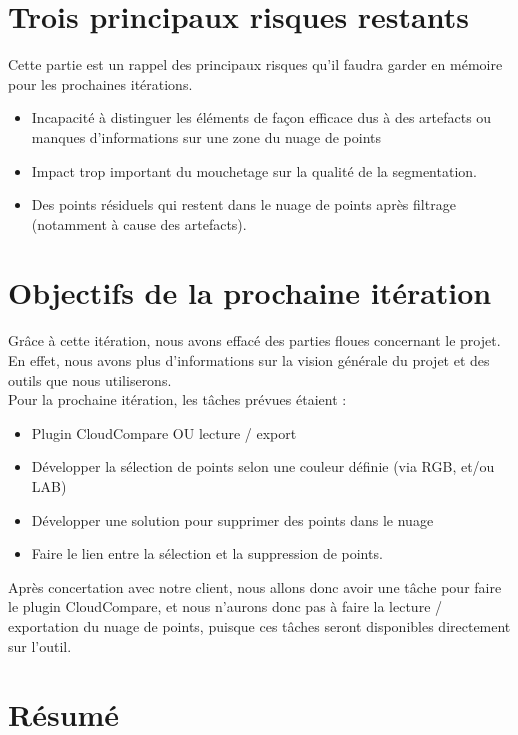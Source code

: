 \documentclass[12pt,titlepage,french]{article}
\begin{document}
\section{Trois principaux risques restants}
Cette partie est un rappel des principaux risques qu'il faudra garder en mémoire pour les prochaines itérations.

\begin{itemize}
  \item Incapacité à distinguer les éléments de façon efficace dus à des artefacts ou manques d'informations sur une zone du nuage de points
  \item Impact trop important du mouchetage sur la qualité de la segmentation.
  \item Des points résiduels qui restent dans le nuage de points après filtrage (notamment à cause des artefacts).
\end{itemize}

\section{Objectifs de la prochaine itération}
Grâce à cette itération, nous avons effacé des parties floues concernant le projet. En effet, nous avons plus d'informations sur la vision générale du projet et des outils que nous utiliserons. \\
Pour la prochaine itération, les tâches prévues étaient :
\begin{itemize}
  \item Plugin CloudCompare OU lecture / export
  \item Développer la sélection de points selon une couleur définie (via RGB, et/ou LAB)
  \item Développer une solution pour supprimer des points dans le nuage
  \item Faire le lien entre la sélection et la suppression de points.
\end{itemize}

Après concertation avec notre client, nous allons donc avoir une tâche pour faire le plugin CloudCompare, et nous n'aurons donc pas à faire la lecture / exportation du nuage de points, puisque ces tâches seront disponibles directement sur l'outil.

\section{Résumé}
\end{document}
